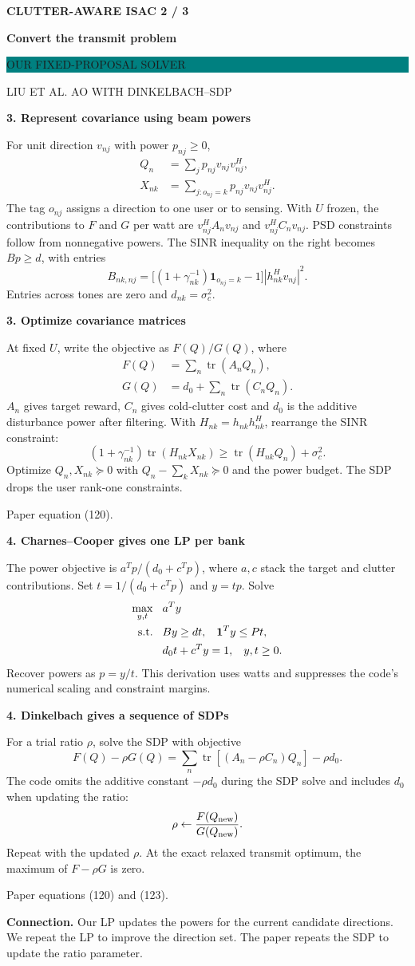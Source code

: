 \documentclass[11pt]{article}
\newcommand{\tr}{\operatorname{tr}}
\newcommand{\pair}[2]{%
\noindent\begin{minipage}[t]{.475\linewidth}\vspace{0pt}#1\end{minipage}\hfill
\begin{minipage}[t]{.475\linewidth}\vspace{0pt}#2\end{minipage}\par}
\newcommand{\head}[2]{%
{\sffamily\small\bfseries\color{teal} CLUTTER-AWARE ISAC \hfill #1 / 3}\par
{\sffamily\LARGE\bfseries\color{ink} #2}\par\vspace{3pt}
\pair{\colorbox{teal}{\parbox{.95\linewidth}{\color{white}\sffamily\bfseries\strut OUR FIXED-PROPOSAL SOLVER}}}
{\colorbox{paper}{\parbox{.95\linewidth}{\color{white}\sffamily\bfseries\strut LIU ET AL.\hspace{.85em} AO WITH DINKELBACH--SDP}}}\vspace{4pt}}
\newcommand{\sect}[1]{\par{\sffamily\large\bfseries\color{ink} #1}\par\vspace{-3pt}}
\newcommand{\rowline}{\par\vspace{3pt}{\color{line}\hrule}\vspace{5pt}}
\newcommand{\note}[1]{\par\vspace{7pt}\noindent\colorbox{wash}{\parbox{.98\linewidth}{\strut #1\strut}}\par}
\begin{document}
\newpage
\head{2}{Convert the transmit problem}
\pair{
\sect{3. Represent covariance using beam powers}
For unit direction $v_{nj}$ with power $p_{nj}\ge0$,
\[
\begin{aligned}
Q_n&=\sum_j p_{nj}v_{nj}v_{nj}^H,\\
X_{nk}&=\sum_{j:o_{nj}=k}p_{nj}v_{nj}v_{nj}^H.
\end{aligned}
\]
The tag $o_{nj}$ assigns a direction to one user or to sensing. With $U$ frozen, the contributions to $F$ and $G$ per watt are $v_{nj}^HA_nv_{nj}$ and $v_{nj}^HC_nv_{nj}$. PSD constraints follow from nonnegative powers. The SINR inequality on the right becomes $Bp\ge d$, with entries
\[
B_{nk,nj}=\big[(1+\gamma_{nk}^{-1})\mathbf1_{o_{nj}=k}-1\big]|h_{nk}^Hv_{nj}|^2.
\]
Entries across tones are zero and $d_{nk}=\sigma_c^2$.
}{
\sect{3. Optimize covariance matrices}
At fixed $U$, write the objective as $F(Q)/G(Q)$, where
\[
\begin{aligned}
F(Q)&=\sum_n\tr(A_nQ_n),\\
G(Q)&=d_0+\sum_n\tr(C_nQ_n).
\end{aligned}
\]
$A_n$ gives target reward, $C_n$ gives cold-clutter cost and $d_0$ is the additive disturbance power after filtering. With $H_{nk}=h_{nk}h_{nk}^H$, rearrange the SINR constraint:
\[
(1+\gamma_{nk}^{-1})\tr(H_{nk}X_{nk})
\ge\tr(H_{nk}Q_n)+\sigma_c^2 .
\]
Optimize $Q_n,X_{nk}\succeq0$ with $Q_n-\sum_kX_{nk}\succeq0$ and the power budget. The SDP drops the user rank-one constraints.

{\small\color{paper}Paper equation (120).}
}
\rowline
\pair{
\sect{4. Charnes--Cooper gives one LP per bank}
The power objective is $a^Tp/(d_0+c^Tp)$, where $a,c$ stack the target and clutter contributions. Set $t=1/(d_0+c^Tp)$ and $y=tp$. Solve
\[
\begin{aligned}
\max_{y,t}\hspace{.85em} & a^Ty\\
\text{s.t.}\hspace{.85em} & By\ge dt,\hspace{.85em} \mathbf1^Ty\le Pt,\\
&d_0t+c^Ty=1,\hspace{.85em} y,t\ge0.
\end{aligned}
\]
Recover powers as $p=y/t$. This derivation uses watts and suppresses the code's numerical scaling and constraint margins.
}{
\sect{4. Dinkelbach gives a sequence of SDPs}
For a trial ratio $\rho$, solve the SDP with objective
\[
F(Q)-\rho G(Q)
=\sum_n\tr[(A_n-\rho C_n)Q_n]-\rho d_0 .
\]
The code omits the additive constant $-\rho d_0$ during the SDP solve and includes $d_0$ when updating the ratio:
\[
\rho \leftarrow \frac{F(Q_{\rm new})}{G(Q_{\rm new})}.
\]
Repeat with the updated $\rho$. At the exact relaxed transmit optimum, the maximum of $F-\rho G$ is zero.

{\small\color{paper}Paper equations (120) and (123).}
}
\note{\textbf{Connection.} Our LP updates the powers for the current candidate directions. We repeat the LP to improve the direction set. The paper repeats the SDP to update the ratio parameter.}
\end{document}
